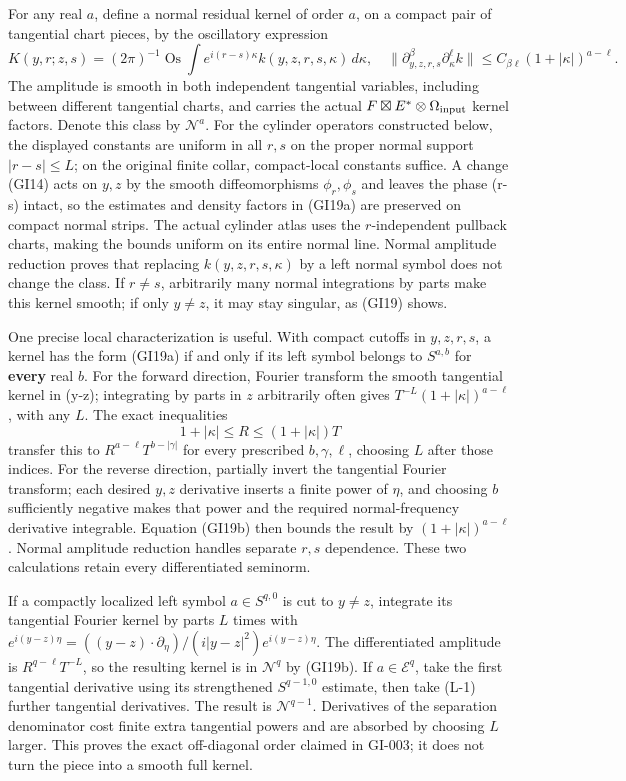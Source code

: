 \documentclass[
  11pt,
]{article}
\begin{document}
For any real \(a\), define a normal residual kernel of order \(a\), on a
compact pair of tangential chart pieces, by the oscillatory expression
\[
 K(y,r;z,s)=(2\pi)^{-1}\operatorname{Os}\int
 e^{i(r-s)\kappa}k(y,z,r,s,\kappa)\,d\kappa,
 \quad
 \|\partial_{y,z,r,s}^{\beta}\partial_\kappa^\ell k\|
 \leq C_{\beta\ell}(1+|\kappa|)^{a-\ell}.
 \tag{GI19a}
\] The amplitude is smooth in both independent tangential variables,
including between different tangential charts, and carries the actual
\(F\boxtimes E^*\otimes\Omega_{\rm input}\) kernel factors. Denote this
class by \(\mathcal N^a\). For the cylinder operators constructed below,
the displayed constants are uniform in all \(r,s\) on the proper normal
support \(|r-s|\leq L\); on the original finite collar, compact-local
constants suffice. A change (GI14) acts on \(y,z\) by the smooth
diffeomorphisms \(\phi_r,\phi_s\) and leaves the phase (r-s) intact, so
the estimates and density factors in (GI19a) are preserved on compact
normal strips. The actual cylinder atlas uses the \(r\)-independent
pullback charts, making the bounds uniform on its entire normal line.
Normal amplitude reduction proves that replacing \(k(y,z,r,s,\kappa)\)
by a left normal symbol does not change the class. If \(r\ne s\),
arbitrarily many normal integrations by parts make this kernel smooth;
if only \(y\ne z\), it may stay singular, as (GI19) shows.

One precise local characterization is useful. With compact cutoffs in
\(y,z,r,s\), a kernel has the form (GI19a) if and only if its left
symbol belongs to \(S^{a,b}\) for \textbf{every} real \(b\). For the
forward direction, Fourier transform the smooth tangential kernel in
(y-z); integrating by parts in \(z\) arbitrarily often gives
\(T^{-L}(1+|\kappa|)^{a-\ell}\), with any \(L\). The exact inequalities
\[
 1+|\kappa|\leq R\leq(1+|\kappa|)T
 \tag{GI19b}
\] transfer this to \(R^{a-\ell}T^{b-|\gamma|}\) for every prescribed
\(b,\gamma,\ell\), choosing \(L\) after those indices. For the reverse
direction, partially invert the tangential Fourier transform; each
desired \(y,z\) derivative inserts a finite power of \(\eta\), and
choosing \(b\) sufficiently negative makes that power and the required
normal-frequency derivative integrable. Equation (GI19b) then bounds the
result by \((1+|\kappa|)^{a-\ell}\). Normal amplitude reduction handles
separate \(r,s\) dependence. These two calculations retain every
differentiated seminorm.

If a compactly localized left symbol \(a\in S^{q,0}\) is cut to
\(y\ne z\), integrate its tangential Fourier kernel by parts \(L\) times
with
\(e^{i(y-z)\eta}=((y-z)\cdot\partial_\eta)/(i|y-z|^2)e^{i(y-z)\eta}\).
The differentiated amplitude is \(R^{q-\ell}T^{-L}\), so the resulting
kernel is in \(\mathcal N^q\) by (GI19b). If \(a\in\mathscr E^q\), take
the first tangential derivative using its strengthened \(S^{q-1,0}\)
estimate, then take (L-1) further tangential derivatives. The result is
\(\mathcal N^{q-1}\). Derivatives of the separation denominator cost
finite extra tangential powers and are absorbed by choosing \(L\)
larger. This proves the exact off-diagonal order claimed in GI-003; it
does not turn the piece into a smooth full kernel.
\end{document}
